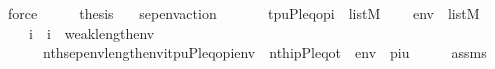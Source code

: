 \begin{isabellebody}
\ force\isanewline
\ \ \isamarkupfalse%
\ \isamarkupfalse%
\ {\isacharquery}{\kern0pt}thesis\ \ \isacommand{{\isachardot}{\kern0pt}{\isachardot}{\kern0pt}}\isamarkupfalse%
\isanewline
{}\isamarkupfalse%
%
\endisatagproof
{\isafoldproof}%
%
\isadelimproof
\isanewline
%
\endisadelimproof
\isanewline
\isanewline
{}\isamarkupfalse%
\ sep{\isacharunderscore}{\kern0pt}env{\isacharunderscore}{\kern0pt}action{\isacharcolon}{\kern0pt}\isanewline
\ \ \isanewline
\ \ \ \ {\isachardoublequoteopen}{\isacharbrackleft}{\kern0pt}t{\isacharcomma}{\kern0pt}p{\isacharcomma}{\kern0pt}u{\isacharcomma}{\kern0pt}P{\isacharcomma}{\kern0pt}leq{\isacharcomma}{\kern0pt}o{\isacharcomma}{\kern0pt}pi{\isacharbrackright}{\kern0pt}\ {\isasymin}\ list{\isacharparenleft}{\kern0pt}M{\isacharparenright}{\kern0pt}{\isachardoublequoteclose}\isanewline
\ \ \ \ {\isachardoublequoteopen}env\ {\isasymin}\ list{\isacharparenleft}{\kern0pt}M{\isacharparenright}{\kern0pt}{\isachardoublequoteclose}\isanewline
\ \ \ {\isachardoublequoteopen}{\isasymforall}\ i\ {\isachardot}{\kern0pt}\ i\ {\isasymin}\ weak{\isacharparenleft}{\kern0pt}length{\isacharparenleft}{\kern0pt}env{\isacharparenright}{\kern0pt}{\isacharcomma}{\kern0pt}{}{\isacharparenright}{\kern0pt}\ {\isasymlongrightarrow}\ \isanewline
\ \ \ \ \ \ nth{\isacharparenleft}{\kern0pt}sep{\isacharunderscore}{\kern0pt}env{\isacharparenleft}{\kern0pt}length{\isacharparenleft}{\kern0pt}env{\isacharparenright}{\kern0pt}{\isacharparenright}{\kern0pt}{\isacharbackquote}{\kern0pt}i{\isacharcomma}{\kern0pt}{\isacharbrackleft}{\kern0pt}t{\isacharcomma}{\kern0pt}p{\isacharcomma}{\kern0pt}u{\isacharcomma}{\kern0pt}P{\isacharcomma}{\kern0pt}leq{\isacharcomma}{\kern0pt}o{\isacharcomma}{\kern0pt}pi{\isacharbrackright}{\kern0pt}{\isacharat}{\kern0pt}env{\isacharparenright}{\kern0pt}\ {\isacharequal}{\kern0pt}\ nth{\isacharparenleft}{\kern0pt}i{\isacharcomma}{\kern0pt}{\isacharbrackleft}{\kern0pt}p{\isacharcomma}{\kern0pt}P{\isacharcomma}{\kern0pt}leq{\isacharcomma}{\kern0pt}o{\isacharcomma}{\kern0pt}t{\isacharbrackright}{\kern0pt}\ {\isacharat}{\kern0pt}\ env\ {\isacharat}{\kern0pt}\ {\isacharbrackleft}{\kern0pt}pi{\isacharcomma}{\kern0pt}u{\isacharbrackright}{\kern0pt}{\isacharparenright}{\kern0pt}{\isachardoublequoteclose}\isanewline
%
\isadelimproof
%
\endisadelimproof
%
\isatagproof
{}\isamarkupfalse%
\ {\isacharminus}{\kern0pt}\isanewline
\ \ \isamarkupfalse%
\ assms\isanewline
\ \ \isamarkupfalse%

\end{isabellebody}
